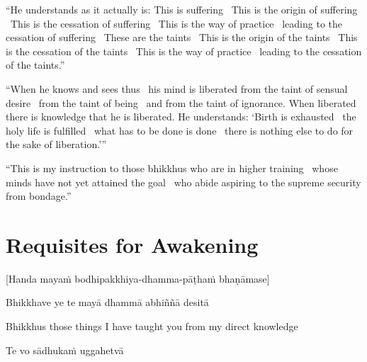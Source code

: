 \begin{justify}
“He understands as it actually is: This is suffering \breathmark\ This is the origin of suffering \breathmark\ This is the cessation of suffering \breathmark\ This is the way of practice \breathmark\ leading to the cessation of suffering \breathmark\ These are the taints \breathmark\ This is the origin of the taints \breathmark\ This is the cessation of the taints \breathmark\ This is the way of practice \breathmark\ leading to the cessation of the taints.”
\end{justify}

\begin{justify}
“When he knows and sees thus \breathmark\ his mind is liberated from the taint of sensual desire \breathmark\ from the taint of being \breathmark\ and from the taint of ignorance. When liberated there is knowledge that he is liberated. He understands: ‘Birth is exhausted \breathmark\ the holy life is fulfilled \breathmark\ what has to be done is done \breathmark\ there is nothing else to do for the sake of liberation.’”
\end{justify}

\suttaRef{[MN 39]}

\begin{justify}
“This is my instruction to those bhikkhus who are in higher training \breathmark\ whose minds have not yet attained the goal \breathmark\ who abide aspiring to the supreme security from bondage.”
\end{justify}

\suttaRef{[MN 107]}


\section{Requisites for Awakening}
\label{requisites-for-awakening}

\begin{center}
  [Handa mayaṁ bodhipakkhiya-dhamma-pāṭhaṁ bhaṇāmase]
\end{center}

Bhikkhave ye te mayā dhammā abhiññā desitā

\begin{english}
  Bhikkhus those things I have taught you from my direct knowledge
\end{english}

Te vo sādhukaṁ uggahetvā

